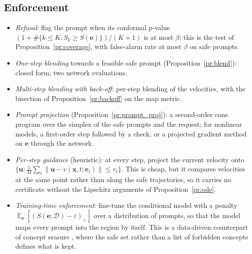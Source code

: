 \documentclass{article}
\DeclareMathOperator{\E}{\mathbb{E}}
\newcommand{\cD}{\mathcal{D}}                       %
\newcommand{\bx}{\mathbf{x}}
\newcommand{\be}{\mathbf{e}}                       %
\theoremstyle{plain}
\begin{document}
\subsection{Enforcement}\label{subsec:enforcement}
\begin{itemize}
\item \emph{Refusal}: flag the prompt when its conformal p-value
$(1+\#\{k\leq K:S_k\geq S(\be)\})/(K+1)$ is at most $\beta$; this is the test of
Proposition~\ref{pr:coverage}, with false-alarm rate at most $\beta$ on safe prompts.
\item \emph{One-step blending} towards a feasible safe prompt (Proposition~\ref{pr:blend}): closed form, two
network evaluations.
\item \emph{Multi-step blending with back-off}: per-step blending of the velocities, with the bisection of
Proposition~\ref{pr:backoff} on the map metric.
\item \emph{Prompt projection} (Proposition~\ref{pr:prompt_proj}): a second-order cone program over the simplex
of the safe prompts and the request; for nonlinear models, a first-order step followed by a check, or a
projected gradient method on $\be$ through the network.
\item \emph{Per-step guidance} (heuristic): at every step, project the current velocity onto
$\{\mathbf{u}:\frac1M\sum_i\|\mathbf{u}-v(\bx,t;\be_i)\|\leq r_t\}$. This is cheap, but it compares velocities at the same point
rather than along the safe trajectories, so it carries no certificate without the Lipschitz arguments of
Proposition~\ref{pr:ode}.
\item \emph{Training-time enforcement}: fine-tune the conditional model with a penalty
$\E_{\be}[(S(\be;\cD)-\varepsilon)_+]$ over a distribution of prompts, so that the model maps every prompt into the
region by itself. This is a data-driven counterpart of concept erasure \citep{gandikota2023erasing}, where the
safe set rather than a list of forbidden concepts defines what is kept.
\end{itemize}
\end{document}
